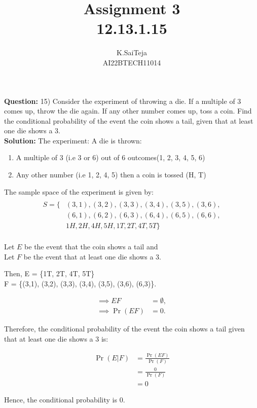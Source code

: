 \documentclass[journal,12pt,two column]{IEEEtran}
\title{Assignment 3 \\ 12.13.1.15}
\author{K.SaiTeja \\ AI22BTECH11014}
\providecommand{\pr}[1]{\ensuremath{\Pr\left(#1\right)}}
\newcommand{\question}{\noindent \textbf{Question: }}
\newcommand{\solution}{\noindent \textbf{Solution: }}
\begin{document}
\maketitle
\question 15)
Consider the experiment of throwing a die. If a multiple of 3 comes up, throw the die again. If any other number comes up, toss a coin. Find the conditional probability of the event the coin shows a tail, given that  at least one die shows a 3.\\

\solution
The experiment: A die is thrown: 
\begin{enumerate}
\item A multiple of 3 (i.e 3 or 6)  out of 6 outcomes(1, 2, 3, 4, 5, 6)                          
\item Any other number (i.e 1, 2, 4, 5)   then a coin is tossed (H, T)
\end{enumerate}
The sample space of the experiment is given by:
\begin{align*}\\
S = \{&(3,1), (3,2), (3,3), (3,4), (3,5), (3,6), \\
&(6,1), (6,2), (6,3), (6,4), (6,5), (6,6), \\
&1H, 2H, 4H, 5H, 1T, 2T, 4T, 5T\}
\end{align*} 
\\
Let $E$ be the event that the coin shows a tail and \\ Let $F$ be the event that at least one die shows a 3. 
\begin{center}
Then, E = \{1T, 2T, 4T, 5T\} \\
F = \{(3,1), (3,2), (3,3), (3,4), (3,5), (3,6), (6,3)\}.
\end{center}
\begin{align}
\implies EF &= \emptyset,\\ \implies \Pr(EF) &= 0.
\end{align}
\begin{center}
Therefore, the conditional probability of the event the coin shows a tail given that at least one die shows a 3 is:
\end{center}
\begin{align}
\pr{E|F} &= \frac{\pr{EF}}{\pr{F}} \\
&= \frac{0}{\Pr(F)} \\
&= 0
\end{align}

Hence, the conditional probability is 0.
\end{document}
